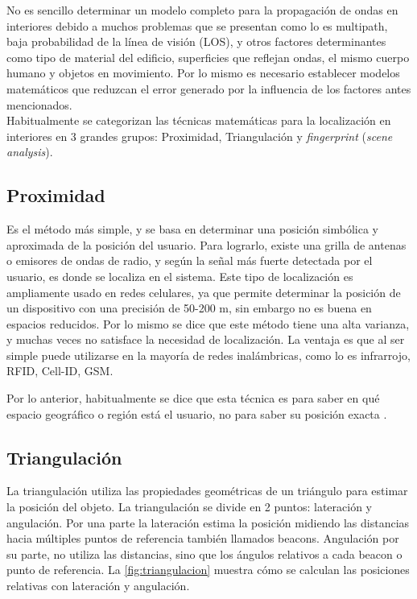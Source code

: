 No es sencillo determinar un modelo completo para la propagación de ondas en interiores debido a muchos problemas que se presentan como lo es multipath,  baja probabilidad de la línea de visión (LOS), y otros factores determinantes como tipo de material del edificio, superficies que reflejan ondas, el mismo cuerpo humano y objetos en movimiento. Por lo mismo es necesario establecer modelos matemáticos que reduzcan el error generado por la influencia de los factores antes mencionados.\\

Habitualmente se categorizan las técnicas matemáticas para la localización en interiores en 3 grandes grupos: Proximidad, Triangulación  y \textit{fingerprint} (\textit{scene analysis}).

\subsection{Proximidad}

Es el método más simple, y se basa en determinar una posición simbólica y aproximada de la posición del usuario. Para lograrlo, existe una grilla de antenas o emisores de ondas de radio, y según la señal más fuerte detectada por el usuario, es donde se localiza en el sistema. Este tipo de localización es ampliamente usado en redes celulares, ya que permite determinar la posición de un dispositivo con una precisión de 50-200 m, sin embargo no es buena en espacios reducidos. Por lo mismo se dice que este método tiene una alta varianza, y muchas veces no satisface la necesidad de localización. La ventaja es que al ser simple puede utilizarse en la mayoría de redes inalámbricas, como lo es infrarrojo, RFID, Cell-ID, GSM.

Por lo anterior, habitualmente se dice que esta técnica es para saber en qué espacio geográfico o región está el usuario, no para saber su posición exacta \citep{Liu:2007:SWI:2220431.2221077}.

\subsection{Triangulación}

La triangulación utiliza las propiedades geométricas de un triángulo para estimar la posición del objeto.  La triangulación se divide en 2 puntos: lateración y angulación. Por una parte la lateración estima la posición midiendo las distancias hacia múltiples puntos de referencia también llamados beacons. Angulación por su parte, no utiliza las distancias, sino que los ángulos relativos a cada beacon o punto de referencia. La  \autoref{fig:triangulacion} muestra cómo se calculan las posiciones relativas con lateración y angulación.


